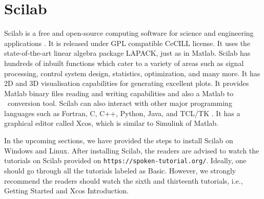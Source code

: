 
\section{Scilab}
\label{sec:sci-start}
Scilab is a free and open-source computing software for science and
engineering applications \cite{scilab-ref}. It is released under GPL
compatible CeCILL license.  It uses the state-of-the-art linear
algebra package LAPACK, just as in Matlab.  Scilab has hundreds of
inbuilt functions which cater to a variety of areas such as signal
processing, control system design, statistics, optimization, and many
more. It has 2D and 3D visualisation capabilities for generating
excellent plots. It provides Matlab binary files reading and writing
capabilities and also a Matlab to \scilab\ conversion tool. Scilab can
also interact with other major programming languages such as Fortran,
C, C++, Python, Java, and TCL/TK \cite{scilab-interop}.  It has a
graphical editor called Xcos, which is similar to Simulink of Matlab. 

In the upcoming sections, we have provided the steps to install Scilab on 
Windows and Linux. After installing Scilab, the readers are advised to 
watch the tutorials on Scilab provided on {\tt https://spoken-tutorial.org/}. 
Ideally, one should go through all the tutorials labeled as Basic. 
However, we strongly recommend the readers should watch the sixth and 
thirteenth tutorials, i.e., Getting Started and Xcos Introduction. 


